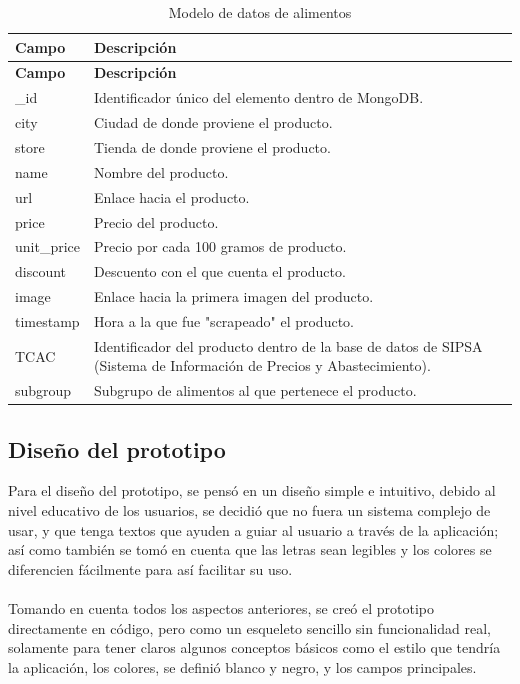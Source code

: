 \begin{longtable}[c]{| p{}  | p{}  |}
    \caption{Modelo de datos de alimentos}
    \label{tab:modeloDatosAlimentos}
    \\ \hline \textbf{Campo} & \textbf{Descripci\'on} \\ \hline
    \endfirsthead
    \hline
    \textbf{Campo} & \textbf{Descripci\'on} \\ \hline
    \endhead
    \hline
    \endfoot
    \hline
    \endlastfoot

    \_id & Identificador \'unico del elemento dentro de MongoDB. \\ \hline
    city & Ciudad de donde proviene el producto. \\ \hline
    store & Tienda de donde proviene el producto. \\ \hline
    name & Nombre del producto. \\ \hline
    url & Enlace hacia el producto. \\ \hline
    price & Precio del producto. \\ \hline
    unit\_price & Precio por cada 100 gramos de producto. \\ \hline
    discount & Descuento con el que cuenta el producto. \\ \hline
    image & Enlace hacia la primera imagen del producto. \\ \hline
    timestamp & Hora a la que fue "scrapeado" el producto. \\ \hline
    TCAC & Identificador del producto dentro de la base de datos de SIPSA (Sistema de Informaci\'on de Precios y Abastecimiento). \\ \hline
    subgroup & Subgrupo de alimentos al que pertenece el producto. \\ \hline

\end{longtable}



\subsection{Dise\~no del prototipo}

\noindent Para el dise\~no del prototipo, se pens\'o en un dise\~no simple e intuitivo, debido al nivel educativo de los usuarios, se decidi\'o que no fuera un sistema complejo de usar, y que tenga textos que ayuden a guiar al usuario a trav\'es de la aplicaci\'on; as\'i como tambi\'en se tom\'o en cuenta que las letras sean legibles y los colores se diferencien f\'acilmente para  as\'i facilitar su uso.
\\
\\
\noindent Tomando en cuenta todos los aspectos anteriores, se cre\'o el prototipo directamente en c\'odigo, pero como un esqueleto sencillo sin funcionalidad real, solamente para tener claros algunos conceptos b\'asicos como el estilo que tendr\'ia la aplicaci\'on, los colores, se defini\'o blanco y negro, y los campos principales.


